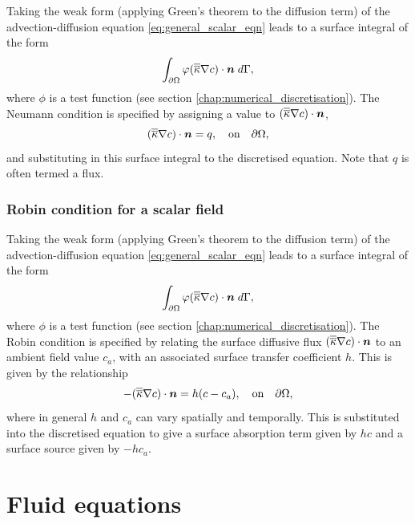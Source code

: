 Taking the weak form (applying Green's theorem to the diffusion term) of the advection-diffusion equation \eqref{eq:general_scalar_eqn} leads to a surface integral of the form
\begin{equation*}
\int_{\partial\Omega} \varphi (\overline{\overline{\kappa}}\nabla c)\cdot{\mbox{\boldmath$n$}} \;d\Gamma,
\end{equation*}
where $\phi$ is a test function (see section \ref{chap:numerical_discretisation}).
The Neumann condition is specified by assigning a value to $(\overline{\overline{\kappa}}\nabla c)\cdot{\mbox{\boldmath$n$}}$, \eg
\begin{equation*}
(\overline{\overline{\kappa}}\nabla c)\cdot{\mbox{\boldmath$n$}} = q,\quad \textrm{on}\quad \partial\Omega,
\end{equation*}
and substituting in this surface integral to the discretised equation. Note that $q$ is often termed a flux.


\subsubsection{Robin condition for a scalar field}\label{sec:bc_scalar_robin}

Taking the weak form (applying Green's theorem to the diffusion term) of the advection-diffusion equation \eqref{eq:general_scalar_eqn} leads to a surface integral of the form
\begin{equation*}
\int_{\partial\Omega} \varphi (\overline{\overline{\kappa}}\nabla c)\cdot{\mbox{\boldmath$n$}} \;d\Gamma,
\end{equation*}
where $\phi$ is a test function (see section \ref{chap:numerical_discretisation}).
The Robin condition is specified by relating the surface diffusive flux $(\overline{\overline{\kappa}}\nabla c)\cdot{\mbox{\boldmath$n$}}$ to an ambient field value $c_{a}$, with an associated surface transfer coefficient $h$. This is given by the relationship
\begin{equation*}
-(\overline{\overline{\kappa}}\nabla c)\cdot{\mbox{\boldmath$n$}} = h (c - c_{a}),\quad \textrm{on}\quad \partial\Omega,
\end{equation*}
where in general $h$ and $c_{a}$ can vary spatially and temporally. This is substituted into the discretised equation to give a surface absorption term given by $hc$ and a surface source given by $-hc_{a}$.


\section{Fluid equations}\label{sec:MP-MomEqn}


